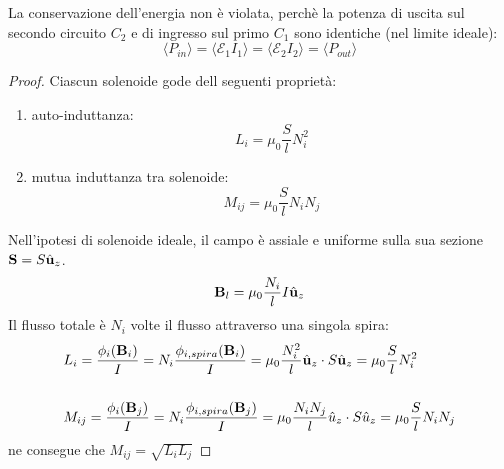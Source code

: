 La conservazione dell'energia non \`e violata, perch\`e la potenza di uscita sul secondo circuito $C_2$  e di ingresso sul primo $C_1$ sono identiche (nel limite ideale):
\begin{equation*}
	\langle P_{in} \rangle = \langle \mathcal{E}_1 I_1 \rangle = \langle \mathcal{E}_2 I_2 \rangle = \langle P_{out} \rangle 
\end{equation*}

\begin{proof}
Ciascun solenoide gode dell seguenti propriet\`a:
\begin{enumerate}
	\item auto-induttanza:
	\begin{equation*}
		L_i = \mu_0 \frac{S}{l}N_i^2
	\end{equation*}
	\item mutua induttanza tra solenoide:
	\begin{equation*}
		M_{ij} = \mu_0 \frac{S}{l}N_i N_j
	\end{equation*}
\end{enumerate}
Nell'ipotesi di solenoide ideale, il campo \`e assiale e uniforme sulla sua sezione $\bold{S} = S \hat{\bold{u}}_z$.
\begin{equation*}
	\bold{B}_l = \mu_0 \frac{N_i}{l}I \hat{\bold{u}}_z
\end{equation*}
Il flusso totale \`e $N_i$ volte il flusso attraverso una singola spira:
\begin{align*}
	& L_i = \frac{\phi_i(\bold{B}_i)}{I} = N_i \frac{\phi_{i,spira}(\bold{B}_i)}{I} = \mu_0 \frac{N_i^2}{l}\hat{\bold{u}}_z \cdot S \hat{\bold{u}}_z = \mu_{0} \frac{S}{l}N_i^2 \\ \rule{0pt}{30pt}
	& M_{ij} = \frac{\phi_i(\bold{B}_j)}{I} = N_i \frac{\phi_{i,spira}(\bold{B}_j)}{I} = \mu_0 \frac{N_i N_j}{l} \hat{u}_z \cdot S \hat{u}_z = \mu_0\frac{S}{l}N_iN_j
\end{align*}
ne consegue che $M_{ij} = \sqrt{L_i L_j}$
\newline


\end{proof}
